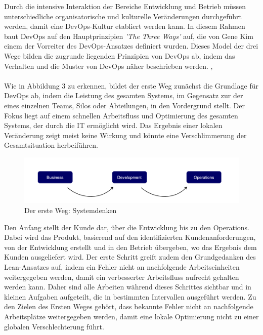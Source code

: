 Durch die intensive Interaktion der Bereiche Entwicklung und Betrieb müssen unterschiedliche organisatorische und kulturelle Veränderungen durchgeführt werden, damit eine DevOps-Kultur etabliert werden kann. In diesem Rahmen baut DevOps auf den Hauptprinzipien \textit{'The Three Ways'} auf, die von Gene Kim einem der Vorreiter des DevOps-Ansatzes \cite{kim_devops-handbuch_2017} definiert wurden. Dieses Model der drei Wege bilden die zugrunde liegenden Prinzipien von DevOps ab, indem das Verhalten und die Muster von DevOps näher beschrieben werden. \cite[S. 9 - 44]{kim_devops-handbuch_2017}, \cite{kim_three_2012}\\\\  

Wie in Abbildung 3 zu erkennen, bildet der erste Weg zunächst die Grundlage für DevOps ab, indem die Leistung des gesamten Systems, im Gegensatz zur der eines einzelnen Teams, Silos oder Abteilungen, in den Vordergrund stellt. Der Fokus liegt auf einem schnellen Arbeitsfluss und Optimierung des gesamten Systems, der durch die IT ermöglicht wird. Das Ergebnis einer lokalen Veränderung zeigt meist keine Wirkung und könnte eine Verschlimmerung der Gesamtsituation herbeiführen. \cite[S. 252]{tiemeyer_handbuch_2021} 

\begin{figure}[h]
    \centering
    \includegraphics[scale=0.5]{Bilder/First Way.png}
    \caption{Der erste Weg: Systemdenken \cite{kim_three_2012}}
\end{figure}

Den Anfang stellt der Kunde dar, über die Entwicklung bis zu den Operations. Dabei wird das Produkt, basierend auf den identifizierten Kundenanforderungen, von der Entwicklung erstellt und in den Betrieb übergeben, wo das Ergebnis dem Kunden ausgeliefert wird.\cite[S. 12]{halstenberg_devops_2020} Der erste Schritt greift zudem den Grundgedanken des Lean-Ansatzes auf, indem ein Fehler nicht an nachfolgende Arbeitseinheiten weitergegeben werden, damit ein verbesserter Arbeitsfluss aufrecht gehalten werden kann. \cite[S. 252]{tiemeyer_handbuch_2021} Daher sind alle Arbeiten während dieses Schrittes sichtbar und in kleinen Aufgaben aufgeteilt, die in bestimmten Intervallen ausgeführt werden. Zu den Zielen des Ersten Weges gehört, dass bekannte Fehler nicht an nachfolgende Arbeitsplätze weitergegeben werden, damit eine lokale Optimierung nicht zu einer globalen Verschlechterung führt. \cite{kim_three_2012}\\\\  

